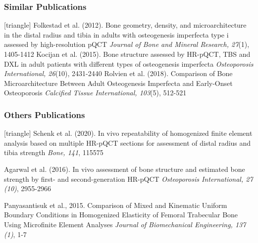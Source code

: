 \documentclass[xcolor=table]{beamer}
\begin{document}

\begin{frame}
	\frametitle{Similar Publications}
	\footnotesize{
		\begin{thebibliography}{99}
			[triangle]
			 Folkestad et al. (2012).
			\newblock Bone geometry, density, and microarchitecture in the distal radius and tibia in adults with osteogenesis imperfecta type i assessed by high-resolution pQCT
			\newblock \textit{Journal of Bone and Mineral Research, 27}(1), 1405-1412
			\vspace{1mm}
			 Kocijan et al. (2015).
			\newblock Bone structure assessed by HR-pQCT, TBS and DXL in adult patients with different types of osteogenesis imperfecta
			\newblock \textit{Osteoporosis International, 26}(10), 2431-2440
			\vspace{1mm}
			 Rolvien et al. (2018).
			\newblock Comparison of Bone Microarchitecture Between Adult Osteogenesis Imperfecta and Early-Onset Osteoporosis
			\newblock \textit{Calcified Tissue International, 103}(5), 512-521
		\end{thebibliography}
	}
\end{frame}


\begin{frame}
	\frametitle{Others Publications}
	\footnotesize{
		\begin{thebibliography}{99}
			[triangle]
			 Schenk et al. (2020).
			\newblock In vivo repeatability of homogenized finite element analysis based on multiple HR-pQCT sections for assessment of distal radius and tibia strength
			\newblock \textit{Bone, 141}, 115575
			
			\vspace{1mm}
			
			 Agarwal et al. (2016).
			\newblock In vivo assessment of bone structure and estimated bone strength by first- and second-generation HR-pQCT
			\newblock \textit{Osteoporosis International, 27 (10)}, 2955-2966
			
			\vspace{1mm}
			
			 Panyasantisuk et al., 2015.
			\newblock Comparison of Mixed and Kinematic Uniform Boundary Conditions in Homogenized Elasticity of Femoral Trabecular Bone Using Microfinite Element Analyses
			\newblock \textit{Journal of Biomechanical Engineering, 137 (1)}, 1-7
			
		\end{thebibliography}
	}
\end{frame}
\end{document}

